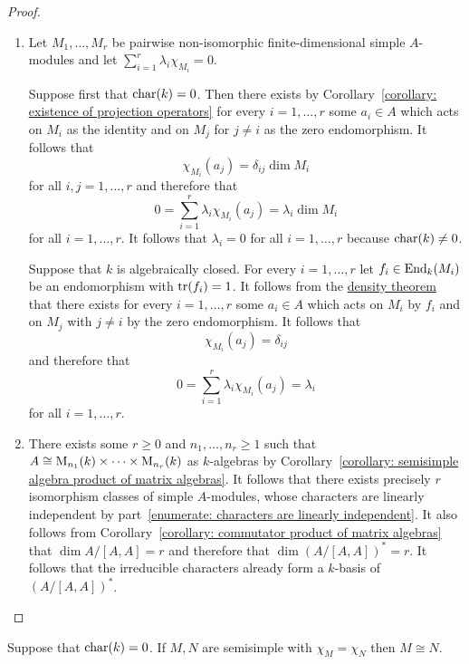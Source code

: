 \begin{proof}
  \leavevmode
  \begin{enumerate}
    \item
      Let $M_1, \dotsc, M_r$ be pairwise non-isomorphic finite-dimensional simple $A$-modules and let $\sum_{i=1}^r \lambda_i \chi_{M_i} = 0$.
      
      Suppose first that $\operatorname{char}(k) = 0$.
      Then there exists by Corollary~\ref{corollary: existence of projection operators} for every $i = 1, \dotsc, r$ some $a_i \in A$ which acts on $M_i$ as the identity and on $M_j$ for $j \neq i$ as the zero endomorphism.
      It follows that
      \[
          \chi_{M_i}(a_j)
        = \delta_{ij} \dim M_i
      \]
      for all $i, j = 1, \dotsc, r$ and therefore that
      \[
          0
        = \sum_{i=1}^r \lambda_i \chi_{M_i}(a_j)
        = \lambda_i \dim M_i
      \]
      for all $i = 1, \dotsc, r$.
      It follows that $\lambda_i = 0$ for all $i = 1, \dotsc, r$ because $\operatorname{char}(k) \neq 0$.
      
      Suppose that $k$ is algebraically closed.
      For every $i = 1, \dotsc, r$ let $f_i \in \operatorname{End}_k(M_i)$ be an endomorphism with $\operatorname{tr}(f_i) = 1$.
      It follows from the \hyperref[theorem: density theorem]{density theorem} that there exists for every $i = 1, \dotsc, r$ some $a_i \in A$ which acts on $M_i$ by $f_i$ and on $M_j$ with $j \neq i$ by the zero endomorphism.
      It follows that
      \[
          \chi_{M_i}(a_j)
        = \delta_{ij}
      \]
      and therefore that
      \[
          0
        = \sum_{i=1}^r \lambda_i \chi_{M_i}(a_j)
        = \lambda_i
      \]
      for all $i = 1, \dotsc, r$.
    \item
      There exists some $r \geq 0$ and $n_1, \dotsc, n_r \geq 1$ such that $A \cong \operatorname{M}_{n_1}(k) \times \dotsb \times \operatorname{M}_{n_r}(k)$ as $k$-algebras by Corollary~\ref{corollary: semisimple algebra product of matrix algebras}.
      It follows that there exists precisely $r$ isomorphism classes of simple $A$-modules, whose characters are linearly independent by part~\ref*{enumerate: characters are linearly independent}.
      It also follows from Corollary~\ref{corollary: commutator product of matrix algebras} that $\dim A/[A,A] = r$ and therefore that $\dim (A/[A,A])^* = r$.
      It follows that the irreducible characters already form a $k$-basis of $(A/[A,A])^*$.
    \qedhere
  \end{enumerate}
\end{proof}


\begin{corollary}
  Suppose that $\operatorname{char}(k) = 0$.
  If $M, N$ are semisimple with $\chi_M = \chi_N$ then $M \cong N$.
\end{corollary}


